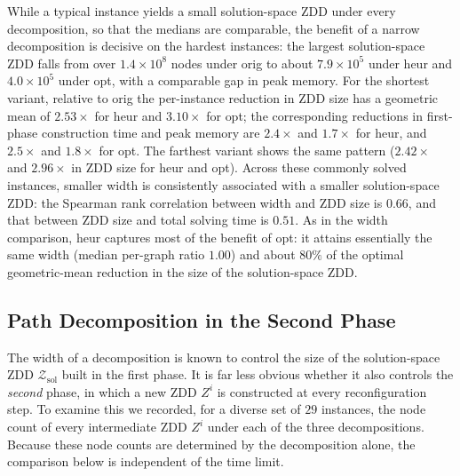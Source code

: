 \documentclass[conference]{IEEEtran}
\newcommand{\zsol}{\mathcal{Z}_{\mathrm{sol}}}
\newcommand{\OrigDecom}{\textsf{orig}\xspace}
\newcommand{\HeurDecom}{\textsf{heur}\xspace}
\newcommand{\OptDecom}{\textsf{opt}\xspace}
\begin{document}
While a typical instance yields a small solution-space ZDD under every
decomposition, so that the medians are comparable, the benefit of a narrow
decomposition is decisive on the hardest instances: the largest solution-space
ZDD falls from over $1.4\times10^{8}$ nodes under \OrigDecom to about
$7.9\times10^{5}$ under \HeurDecom and $4.0\times10^{5}$ under \OptDecom, with a
comparable gap in peak memory.
For the shortest variant, relative to \OrigDecom the per-instance reduction in
ZDD size has a geometric mean of $2.53\times$ for \HeurDecom and $3.10\times$ for
\OptDecom; the corresponding reductions in first-phase construction time and peak
memory are $2.4\times$ and $1.7\times$ for \HeurDecom, and $2.5\times$ and
$1.8\times$ for \OptDecom. The farthest variant shows the same pattern
($2.42\times$ and $2.96\times$ in ZDD size for \HeurDecom and \OptDecom).
Across these commonly solved instances, smaller width is consistently associated
with a smaller solution-space ZDD: the Spearman rank correlation between
width and ZDD size is $0.66$, and that between ZDD size and total solving
time is $0.51$.
As in the width comparison, \HeurDecom captures most of the benefit of
\OptDecom: it attains essentially the same width (median per-graph ratio $1.00$)
and about $80\%$ of the optimal geometric-mean reduction in the size of the
solution-space ZDD.

\subsection{Path Decomposition in the Second Phase}
\label{subsec:secondphase}

The width of a decomposition is known to control the size of the solution-space
ZDD $\zsol$ built in the first phase. It is far less obvious whether it also
controls the \emph{second} phase, in which a new ZDD $Z^i$ is constructed at
every reconfiguration step. To examine this we recorded, for a diverse set of
$29$ instances, the node count of every intermediate ZDD $Z^i$ under each of the
three decompositions. Because these node counts are determined by the
decomposition alone, the comparison below is independent of the time limit.
\end{document}
